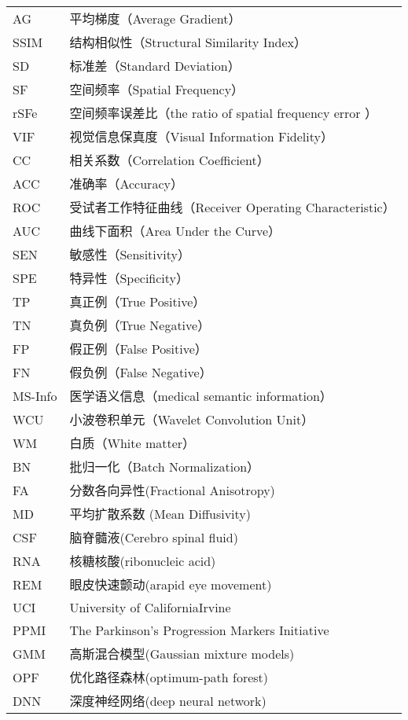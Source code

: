\begin{longtable}{p{2.5cm}<{\centering}p{10.0cm}<{\centering}}
AG   &平均梯度（Average Gradient）  \\
 SSIM    & 结构相似性（Structural Similarity Index）    \\
  SD   & 标准差（Standard Deviation）    \\
SF   & 空间频率（Spatial Frequency）    \\
rSFe  & 空间频率误差比（the ratio of spatial frequency error ）     \\
VIF    & 视觉信息保真度（Visual Information Fidelity）    \\
CC   &相关系数（Correlation Coefficient）   \\
ACC    &准确率（Accuracy）     \\
ROC    & 受试者工作特征曲线（Receiver Operating Characteristic）    \\
AUC  & 曲线下面积（Area Under the Curve）    \\
SEN     &敏感性（Sensitivity）   \\
SPE   & 特异性（Specificity）   \\
TP     & 真正例（True Positive）    \\
TN     & 真负例（True Negative）    \\
FP     & 假正例（False Positive）    \\
 FN    & 假负例（False Negative）    \\
MS-Info & 医学语义信息（medical semantic information）     \\
WCU  & 小波卷积单元（Wavelet Convolution Unit）     \\
WM  & 白质（White matter）     \\
BN  & 批归一化（Batch Normalization）    \\
FA  &分数各向异性(Fractional Anisotropy)      \\
MD  & 平均扩散系数 (Mean Diffusivity)    \\
CSF  & 脑脊髓液(Cerebro spinal fluid)     \\
RNA  & 核糖核酸(ribonucleic acid)     \\
REM  &眼皮快速颤动(arapid eye movement)      \\
UCI  & University of CaliforniaIrvine     \\
PPMI  & The Parkinson’s Progression Markers Initiative     \\
GMM  & 高斯混合模型(Gaussian mixture models)     \\
OPF  & 优化路径森林(optimum-path forest)     \\
DNN  & 深度神经网络(deep neural network)     \\

\end{longtable}
